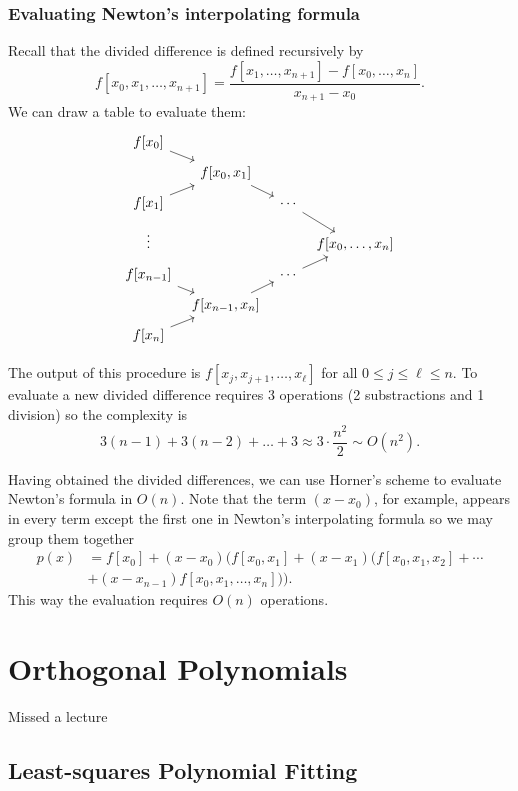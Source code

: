 \documentclass[a4paper]{article}
\begin{document}
\subsubsection{Evaluating Newton's interpolating formula}

Recall that the divided difference is defined recursively by
\[
  f[x_0, x_1, \dots, x_{n + 1}] = \frac{f[x_1, \dots, x_{n + 1}] - f[x_0, \dots, x_n]}{x_{n + 1} - x_0}.
\]
We can draw a table to evaluate them:
\[
  \begin{tikzcd}[column sep=tiny, row sep=tiny]
    f[x_0] \ar[dr] \\
    & f[x_0, x_1] \ar[dr] \\
    f[x_1] \ar[ur] & & \cdots \ar[dr] \\
    \vdots & & & f[x_0, \dots, x_n] \\
    f[x_{n - 1}] \ar[dr] & & \cdots \ar[ur] \\
    & f[x_{n - 1}, x_n] \ar[ur] \\
    f[x_n] \ar[ur]
  \end{tikzcd}
\]

The output of this procedure is \(f[x_j, x_{j + 1}, \dots, x_\ell]\) for all \(0 \leq j \leq \ell \leq n\). To evaluate a new divided difference requires 3 operations (2 substractions and 1 division) so the complexity is
\[
  3(n - 1) + 3(n - 2) + \dots + 3 \approx 3 \cdot \frac{n^2}{2} \sim O(n^2).
\]

Having obtained the divided differences, we can use Horner's scheme to evaluate Newton's formula in \(O(n)\). Note that the term \((x - x_0)\), for example, appears in every term except the first one in Newton's interpolating formula so we may group them together
\begin{align*}
  p(x) &= f[x_0] + (x - x_0) (f[x_0, x_1] + (x - x_1)(f[x_0, x_1, x_2] + \cdots \\
       &+ (x - x_{n - 1})f[x_0, x_1, \dots, x_n])).
\end{align*}
This way the evaluation requires \(O(n)\) operations.

\section{Orthogonal Polynomials}


Missed a lecture

\subsection{Least-squares Polynomial Fitting}
\end{document}
